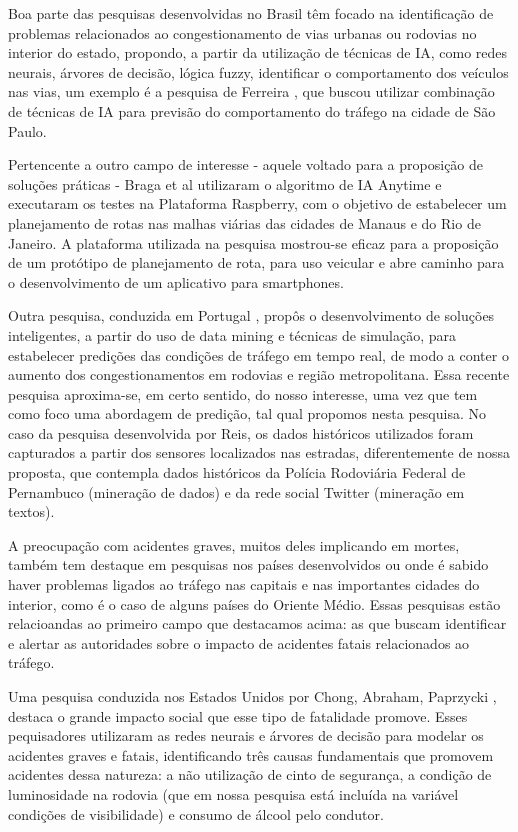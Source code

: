 Boa parte das pesquisas desenvolvidas no Brasil têm focado na identificação de problemas relacionados ao congestionamento de vias urbanas ou rodovias no interior do estado, propondo, a partir da utilização de técnicas de IA, como redes neurais, árvores de decisão, lógica fuzzy, identificar o comportamento dos veículos nas vias, um exemplo é a pesquisa de Ferreira \cite{ferreira2011combinaccao}, que buscou utilizar combinação de técnicas de IA para previsão do comportamento do tráfego na cidade de São Paulo.

Pertencente a outro campo de interesse - aquele voltado para a proposição de soluções práticas - Braga et al \cite{braga2014planejamento} utilizaram o algoritmo de IA Anytime e executaram os testes na Plataforma Raspberry, com o objetivo de estabelecer um planejamento de rotas nas malhas viárias das cidades de Manaus e do Rio de Janeiro. A plataforma utilizada na pesquisa mostrou-se eficaz para a proposição de um protótipo de planejamento de rota, para uso veicular e abre caminho para o desenvolvimento de um aplicativo para smartphones.  

Outra pesquisa, conduzida em Portugal \cite{dos2016previsao}, propôs o desenvolvimento de soluções inteligentes, a partir do uso de data mining e técnicas de simulação, para estabelecer predições das condições de tráfego em tempo real, de modo a conter o aumento dos congestionamentos em rodovias e região metropolitana. Essa recente pesquisa aproxima-se, em certo sentido, do nosso interesse, uma vez que tem como foco uma abordagem de predição, tal qual propomos nesta pesquisa. No caso da pesquisa desenvolvida por Reis, os dados históricos utilizados foram capturados a partir dos sensores localizados nas estradas, diferentemente de nossa proposta, que contempla dados históricos da Polícia Rodoviária Federal de Pernambuco (mineração de dados) e da rede social Twitter (mineração em textos).

A preocupação com acidentes graves, muitos deles implicando em mortes, também tem destaque em pesquisas nos países desenvolvidos ou onde é sabido haver problemas ligados ao tráfego nas capitais e nas importantes cidades do interior, como é o caso de alguns países do Oriente Médio. Essas pesquisas estão relacioandas ao primeiro campo que destacamos acima: as que buscam identificar e alertar as autoridades sobre o impacto de acidentes fatais relacionados ao tráfego.

Uma pesquisa conduzida nos Estados Unidos por Chong, Abraham, Paprzycki \cite{chong2004traffic}, destaca o grande impacto social que esse tipo de fatalidade promove. Esses pequisadores utilizaram as redes neurais e árvores de decisão para modelar os acidentes graves e fatais, identificando três causas fundamentais que promovem acidentes dessa natureza: a não utilização de cinto de segurança, a condição de luminosidade na rodovia (que em nossa pesquisa está incluída na variável condições de visibilidade) e consumo de álcool pelo condutor.

